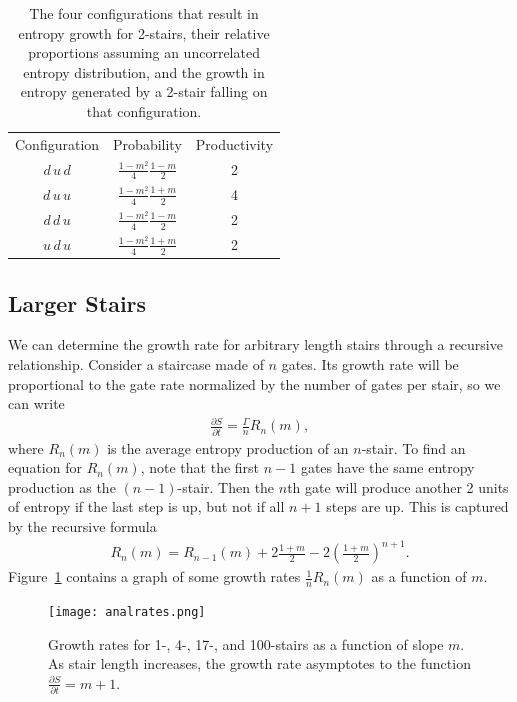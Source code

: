 \documentclass[11pt]{article}
\newcommand{\pd}[2]{\frac{\partial #1}{\partial #2}}
\renewcommand{\th}[1]{\frac{1}{#1}}
\begin{document}
\begin{table}
	\centering
	\begin{tabular}{ccc}
		Configuration & Probability                    & Productivity\\
		$d\,u\,d$     & $\frac{1-m^2}{4}\frac{1-m}{2}$ & 2\\
		$d\,u\,u$     & $\frac{1-m^2}{4}\frac{1+m}{2}$ & 4\\
		$d\,d\,u$     & $\frac{1-m^2}{4}\frac{1-m}{2}$ & 2\\
		$u\,d\,u$     & $\frac{1-m^2}{4}\frac{1+m}{2}$ & 2
	\end{tabular}
	\caption{The four configurations that result in entropy growth for 2-stairs, their relative proportions assuming an uncorrelated entropy distribution, and the growth in entropy generated by a 2-stair falling on that configuration.}
	\label{tab:2stair}
\end{table}

\subsection{Larger Stairs} \emph{} \label{sub:largestairs}

We can determine the growth rate for arbitrary length stairs through a recursive relationship. Consider a staircase made of $n$ gates. Its growth rate will be proportional to the gate rate normalized by the number of gates per stair, so we can write
\begin{align}
\pd{S}{t} = \frac{\Gamma}{n}R_n(m), \label{eqn:growthrate}
\end{align}
where $R_n(m)$ is the average entropy production of an $n$-stair. To find an equation for $R_n(m)$, note that the first $n-1$ gates have the same entropy production as the $(n-1)$-stair. Then the $n$th gate will produce another 2 units of entropy if the last step is up, but not if all $n+1$ steps are up. This is captured by the recursive formula
\begin{align}
R_n(m) = R_{n-1}(m)+2\frac{1+m}{2} - 2\left(\frac{1+m}{2}\right)^{n+1}. \label{eqn:raterecur}
\end{align}
Figure~\ref{fig:growthrates} contains a graph of some growth rates $\th{n}R_n(m)$ as a function of $m$.

\begin{figure}
	\centering
	\texttt{[image: analrates.png]}
	\caption{Growth rates for 1-, 4-, 17-, and 100-stairs as a function of slope $m$. As stair length increases, the growth rate asymptotes to the function $\pd{S}{t} = m+1$.}
	\label{fig:growthrates}
\end{figure}
\end{document}
